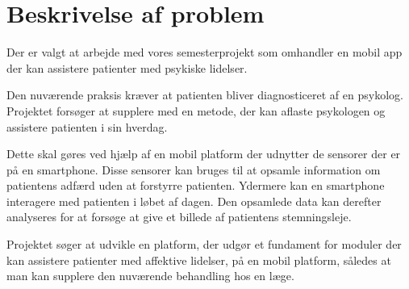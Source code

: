 \section{Beskrivelse af problem}
Der er valgt at arbejde med vores semesterprojekt som omhandler en mobil app der kan assistere patienter med psykiske lidelser.

Den nuværende praksis kræver at patienten bliver diagnosticeret af en psykolog.
Projektet forsøger at supplere med en metode, der kan aflaste psykologen og assistere patienten i sin hverdag.

Dette skal gøres ved hjælp af en mobil platform der udnytter de sensorer der er på en smartphone.
Disse sensorer kan bruges til at opsamle information om patientens adfærd uden at forstyrre patienten.
Ydermere kan en smartphone interagere med patienten i løbet af dagen. 
Den opsamlede data kan derefter analyseres for at forsøge at give et billede af patientens stemningsleje.

Projektet søger at udvikle en platform, der udgør et fundament for moduler der kan assistere patienter med affektive lidelser, på en mobil platform, således at man kan supplere den nuværende behandling hos en læge.